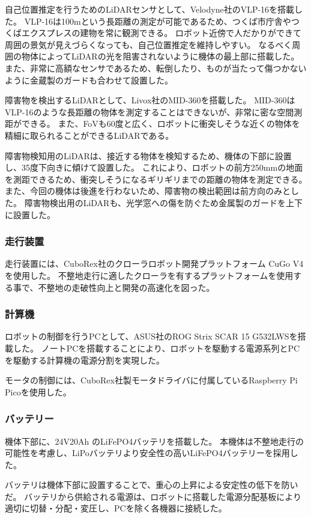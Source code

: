 自己位置推定を行うためのLiDARセンサとして、Velodyne社のVLP-16\cite{VLP16}を搭載した。
VLP-16は100mという長距離の測定が可能であるため、つくば市庁舎やつくばエクスプレスの建物を常に観測できる。
ロボット近傍で人だかりができて周囲の景気が見えづらくなっても、自己位置推定を維持しやすい。
なるべく周囲の物体によってLiDARの光を阻害されないように機体の最上部に搭載した。
また、非常に高額なセンサであるため、転倒したり、ものが当たって傷つかないように金蔵製のガードも合わせて設置した。

障害物を検出するLiDARとして、Livox社のMID-360\cite{MID360}を搭載した。
MID-360はVLP-16のような長距離の物体を測定することはできないが、非常に密な空間測距ができる。
また、FoVも60度と広く、ロボットに衝突しそうな近くの物体を精細に取られることができるLiDARである。

障害物検知用のLiDARは、接近する物体を検知するため、機体の下部に設置し、35度下向きに傾けて設置した。
これにより、ロボットの前方250mmの地面を測距できるため、衝突しそうになるギリギリまでの距離の物体を測定できる。
また、今回の機体は後進を行わないため、障害物の検出範囲は前方向のみとした。
障害物検出用のLiDARも、光学窓への傷を防ぐため金属製のガードを上下に設置した。

\subsubsection{走行装置}
走行装置には、CuboRex社のクローラロボット開発プラットフォーム CuGo V4\cite{CuGo}を使用した。
不整地走行に適したクローラを有するプラットフォームを使用する事で、不整地の走破性向上と開発の高速化を図った。

\subsubsection{計算機}
ロボットの制御を行うPCとして、ASUS社のROG Strix SCAR 15 G532LWS\cite{PC}を搭載した。
ノートPCを搭載することにより、ロボットを駆動する電源系列とPCを駆動する計算機の電源分割を実現した。

モータの制御には、CuboRex社製モータドライバに付属しているRaspberry Pi Pico\cite{PICO}を使用した。

\subsubsection{バッテリー}
機体下部に、24V20Ah のLiFePO4バッテリを搭載した。
本機体は不整地走行の可能性を考慮し、LiPoバッテリより安全性の高いLiFePO4バッテリーを採用した。

バッテリは機体下部に設置することで、重心の上昇による安定性の低下を防いだ。
バッテリから供給される電源は、ロボットに搭載した電源分配基板により適切に切替・分配・変圧し、PCを除く各機器に接続した。

